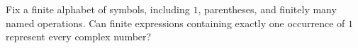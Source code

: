 Fix a finite alphabet of symbols, including $1$, parentheses, and finitely many named operations. Can finite expressions containing exactly one occurrence of $1$ represent every complex number?
